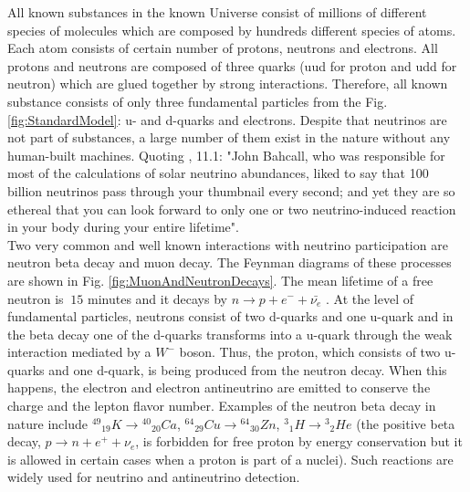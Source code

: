 All known substances in the known Universe consist of millions of different species of molecules which are composed by hundreds different species of atoms. Each atom consists of certain number of protons, neutrons and electrons. All protons and neutrons are composed of three quarks (uud for proton and udd for neutron) which are glued together by strong interactions. Therefore, all known substance consists of only three fundamental particles from the Fig. \ref{fig:StandardModel}: u- and d-quarks and electrons. Despite that neutrinos are not part of substances, a large number of them exist in the nature without any human-built machines. Quoting \cite{ref_Griffiths}, 11.1: "John Bahcall, who was responsible for most of the calculations of solar neutrino abundances, liked to say that 100 billion neutrinos pass through your thumbnail every second; and yet they are so ethereal that you can look forward to only one or two neutrino-induced reaction in your body during your entire lifetime".\\

Two very common and well known interactions with neutrino participation are neutron beta decay and muon decay. The Feynman diagrams of these processes are shown in Fig. \ref{fig:MuonAndNeutronDecays}. The mean lifetime of a free neutron is $~15$ minutes and it decays by $n \rightarrow p + e^- + \bar{{\nu}_e} $ \cite{ref_PDG}. At the level of fundamental particles, neutrons consist of two d-quarks and one u-quark and in the beta decay one of the d-quarks transforms into a u-quark through the weak interaction mediated by a $W^- $ boson. Thus, the proton, which consists of two u-quarks and one d-quark, is being produced from the neutron decay. When this happens, the electron and electron antineutrino are emitted to conserve the charge and the lepton flavor number. Examples of the neutron beta decay in nature include ${^{49}}{_{19}}K \rightarrow {^{40}}{_{20}}Ca$, ${^{64}}{_{29}}Cu \rightarrow {^{64}}{_{30}}Zn$, ${^3}{_1}H \rightarrow {^3}{_2}He$ \cite{ref_Griffiths} (the positive beta decay,  $p \rightarrow n + e^+ + {\nu}_e $, is forbidden for free proton by energy conservation but it is allowed in certain cases when a proton is part of a nuclei). Such reactions are widely used for neutrino and antineutrino detection.\\

